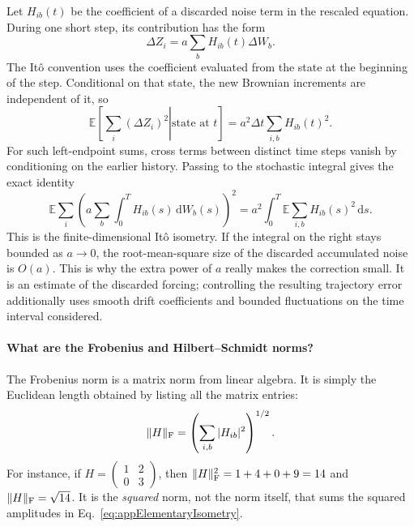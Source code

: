\documentclass{article}
\begin{document}
Let $H_{ib}(t)$ be the coefficient of a discarded noise term in the rescaled equation. During one short step, its contribution has the form
\begin{equation}
    \Delta Z_i=a\sum_bH_{ib}(t)\Delta W_b.
\end{equation}
The It\^{o} convention uses the coefficient evaluated from the state at the beginning of the step. Conditional on that state, the new Brownian increments are independent of it, so
\begin{equation}
    \mathbb E\left[\left.\sum_i(\Delta Z_i)^2\right|\text{state at }t\right]
    =a^2\Delta t\sum_{i,b}H_{ib}(t)^2.
\end{equation}
For such left-endpoint sums, cross terms between distinct time steps vanish by conditioning on the earlier history. Passing to the stochastic integral gives the exact identity
\begin{equation}
    \mathbb E\sum_i\left(a\sum_b\int_0^T H_{ib}(s)\,\mathrm dW_b(s)\right)^2
    =a^2\int_0^T\mathbb E\sum_{i,b}H_{ib}(s)^2\,\mathrm ds.
    \label{eq:appElementaryIsometry}
\end{equation}
This is the finite-dimensional It\^{o} isometry. If the integral on the right stays bounded as $a\to0$, the root-mean-square size of the discarded accumulated noise is $O(a)$. This is why the extra power of $a$ really makes the correction small. It is an estimate of the discarded forcing; controlling the resulting trajectory error additionally uses smooth drift coefficients and bounded fluctuations on the time interval considered.

\paragraph{What are the Frobenius and Hilbert--Schmidt norms?}
The Frobenius norm is a matrix norm from linear algebra. It is simply the Euclidean length obtained by listing all the matrix entries:
\begin{equation}
    \|H\|_{\rm F}=\left(\sum_{i,b}|H_{ib}|^2\right)^{1/2}.
\end{equation}
For instance, if $H=\begin{pmatrix}1&2\\0&3\end{pmatrix}$, then $\|H\|_{\rm F}^2=1+4+0+9=14$ and $\|H\|_{\rm F}=\sqrt{14}$. It is the \emph{squared} norm, not the norm itself, that sums the squared amplitudes in Eq.~\eqref{eq:appElementaryIsometry}.
\end{document}
